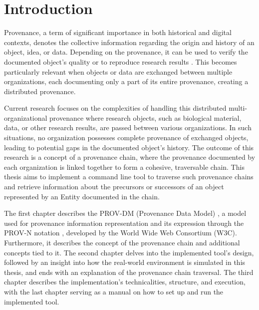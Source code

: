 \documentclass[
  digital,     %
  oneside,     %
  nosansbold,  %
  nocolorbold, %
  lof,         %
  lot,         %
]{fithesis4}
\begin{document}
\chapter*{Introduction} 
\shorthandoff{-}
Provenance, a term of significant importance in both historical and digital contexts, denotes the collective information regarding the origin and history of an object, idea, or data. Depending on the provenance, it can be used to verify the documented object's quality \cite{provquality} or to reproduce research results \cite{provquality}. This becomes particularly relevant when objects or data are exchanged between multiple organizations, each documenting only a part of its entire provenance, creating a distributed provenance. 

Current research \cite{research} focuses on the complexities of handling this distributed multi-organizational provenance where research objects, such as biological material, data, or other research results, are passed between various organizations. In such situations, no organization possesses complete provenance of exchanged objects, leading to potential gaps in the documented object's history. The outcome of this research is a concept of a provenance chain, where the provenance documented by each organization is linked together to form a cohesive, traversable chain. This thesis aims to implement a command line tool to traverse such provenance chains and retrieve information about the precursors or successors of an object represented by an Entity documented in the chain.

The first chapter describes the PROV-DM (Provenance Data Model) \cite{provdm}, a model used for provenance information representation and its expression through the PROV-N notation \cite{provn}, developed by the World Wide Web Consortium (W3C). Furthermore, it describes the concept of the provenance chain and additional concepts tied to it. The second chapter delves into the implemented tool's design, followed by an insight into how the real-world environment is simulated in this thesis, and ends with an explanation of the provenance chain traversal. The third chapter describes the implementation's technicalities, structure, and execution, with the last chapter serving as a manual on how to set up and run the implemented tool.
\shorthandon{-}
\end{document}
